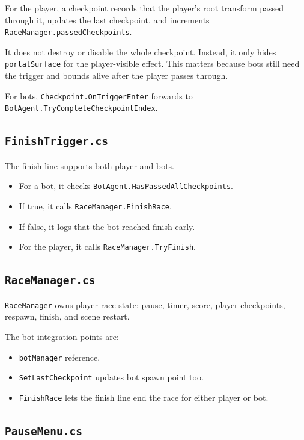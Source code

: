 \documentclass[11pt]{article}
\newcommand{\file}[1]{\texttt{#1}}
\newcommand{\code}[1]{{\footnotesize\texttt{#1}}}
\begin{document}
For the player, a checkpoint records that the player's root transform passed through it, updates the last checkpoint, and increments \code{RaceManager.passedCheckpoints}.

It does not destroy or disable the whole checkpoint. Instead, it only hides \code{portalSurface} for the player-visible effect. This matters because bots still need the trigger and bounds alive after the player passes through.

For bots, \code{Checkpoint.OnTriggerEnter} forwards to \code{BotAgent.TryCompleteCheckpointIndex}.

\subsection{\file{FinishTrigger.cs}}

The finish line supports both player and bots.

\begin{itemize}
    \item For a bot, it checks \code{BotAgent.HasPassedAllCheckpoints}.
    \item If true, it calls \code{RaceManager.FinishRace}.
    \item If false, it logs that the bot reached finish early.
    \item For the player, it calls \code{RaceManager.TryFinish}.
\end{itemize}

\subsection{\file{RaceManager.cs}}

\code{RaceManager} owns player race state: pause, timer, score, player checkpoints, respawn, finish, and scene restart.

The bot integration points are:

\begin{itemize}
    \item \code{botManager} reference.
    \item \code{SetLastCheckpoint} updates bot spawn point too.
    \item \code{FinishRace} lets the finish line end the race for either player or bot.
\end{itemize}

\subsection{\file{PauseMenu.cs}}
\end{document}
